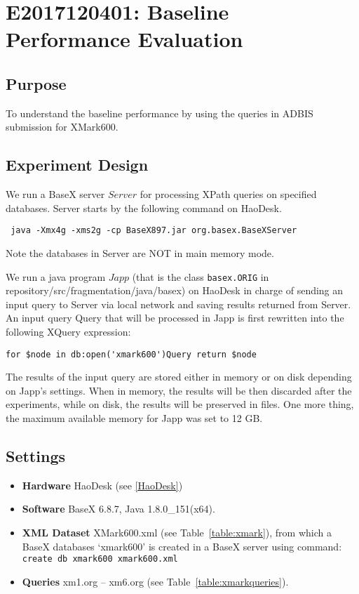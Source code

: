 \section{E2017120401: Baseline Performance Evaluation}

\subsection{Purpose}
To understand the baseline performance by using
the queries in ADBIS submission for XMark600.

\subsection{Experiment Design}

We run a BaseX server $Server$ for processing XPath queries on specified
databases. Server starts by the following command on HaoDesk.

\verb| java -Xmx4g -xms2g -cp BaseX897.jar org.basex.BaseXServer|

Note the databases in Server are NOT in main memory mode.

We run a java program $Japp$ (that is the class \texttt{basex.ORIG}
in repository/src/fragmentation/java/basex)
on HaoDesk in charge of sending an input query to
Server via local network and saving results returned from Server. An input query
Query that will be processed in Japp is first rewritten into the following XQuery expression:

\verb|for $node in db:open('xmark600')Query return $node|

The results of the input query are stored either in memory or on disk depending on Japp's settings. When in memory, the results will be then discarded after the
experiments, while on disk, the results will be preserved in files. One more thing, the maximum available memory for Japp was set to 12 GB.

\subsection{Settings}

\begin{itemize}

	\item \textbf{Hardware} HaoDesk (see \ref{HaoDesk})\\
	\item \textbf{Software} BaseX 6.8.7, Java 1.8.0\_151(x64).\\
	\item \textbf{XML Dataset} XMark600.xml (see Table~\ref{table:xmark}),
	from which a BaseX databases `xmark600' is created in a BaseX server using command:\\
	\verb|create db xmark600 xmark600.xml|
	\item \textbf{Queries} xm1.org -- xm6.org (see Table~\ref{table:xmarkqueries}).

\end{itemize}


